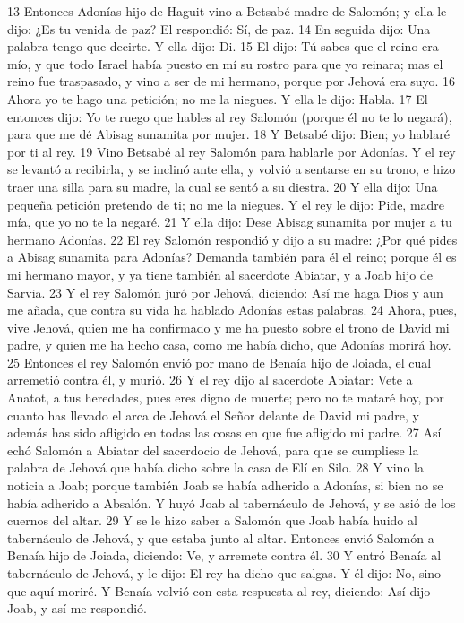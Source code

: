 13 Entonces Adonías hijo de Haguit vino a Betsabé madre de Salomón; y ella le dijo: ¿Es tu venida de paz? El respondió: Sí, de paz.
14 En seguida dijo: Una palabra tengo que decirte. Y ella dijo: Di.
15 El dijo: Tú sabes que el reino era mío, y que todo Israel había puesto en mí su rostro para que yo reinara; mas el reino fue traspasado, y vino a ser de mi hermano, porque por Jehová era suyo.
16 Ahora yo te hago una petición; no me la niegues. Y ella le dijo: Habla.
17 El entonces dijo: Yo te ruego que hables al rey Salomón (porque él no te lo negará), para que me dé Abisag sunamita por mujer.
18 Y Betsabé dijo: Bien; yo hablaré por ti al rey.
19 Vino Betsabé al rey Salomón para hablarle por Adonías. Y el rey se levantó a recibirla, y se inclinó ante ella, y volvió a sentarse en su trono, e hizo traer una silla para su madre, la cual se sentó a su diestra.
20 Y ella dijo: Una pequeña petición pretendo de ti; no me la niegues. Y el rey le dijo: Pide, madre mía, que yo no te la negaré.
21 Y ella dijo: Dese Abisag sunamita por mujer a tu hermano Adonías.
22 El rey Salomón respondió y dijo a su madre: ¿Por qué pides a Abisag sunamita para Adonías? Demanda también para él el reino; porque él es mi hermano mayor, y ya tiene también al sacerdote Abiatar, y a Joab hijo de Sarvia.
23 Y el rey Salomón juró por Jehová, diciendo: Así me haga Dios y aun me añada, que contra su vida ha hablado Adonías estas palabras.
24 Ahora, pues, vive Jehová, quien me ha confirmado y me ha puesto sobre el trono de David mi padre, y quien me ha hecho casa, como me había dicho, que Adonías morirá hoy.
25 Entonces el rey Salomón envió por mano de Benaía hijo de Joiada, el cual arremetió contra él, y murió.
26 Y el rey dijo al sacerdote Abiatar: Vete a Anatot, a tus heredades, pues eres digno de muerte; pero no te mataré hoy, por cuanto has llevado el arca de Jehová el Señor delante de David mi padre, y además has sido afligido en todas las cosas en que fue afligido mi padre. 
27 Así echó Salomón a Abiatar del sacerdocio de Jehová, para que se cumpliese la palabra de Jehová que había dicho sobre la casa de Elí en Silo. 
28 Y vino la noticia a Joab; porque también Joab se había adherido a Adonías, si bien no se había adherido a Absalón. Y huyó Joab al tabernáculo de Jehová, y se asió de los cuernos del altar.
29 Y se le hizo saber a Salomón que Joab había huido al tabernáculo de Jehová, y que estaba junto al altar. Entonces envió Salomón a Benaía hijo de Joiada, diciendo: Ve, y arremete contra él.
30 Y entró Benaía al tabernáculo de Jehová, y le dijo: El rey ha dicho que salgas. Y él dijo: No, sino que aquí moriré. Y Benaía volvió con esta respuesta al rey, diciendo: Así dijo Joab, y así me respondió.
